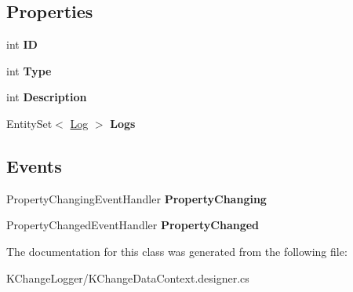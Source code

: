 \subsection*{Properties}
\begin{DoxyCompactItemize}
\item 
\hypertarget{class_k_change_logger_1_1_log___type_a3e5c1acf1eb6dbd8eb2b9b58bddafde5}{int {\bfseries I\-D}}\label{class_k_change_logger_1_1_log___type_a3e5c1acf1eb6dbd8eb2b9b58bddafde5}

\item 
\hypertarget{class_k_change_logger_1_1_log___type_ac250e1c00b8919515d4b7c14ac132bc3}{int {\bfseries Type}}\label{class_k_change_logger_1_1_log___type_ac250e1c00b8919515d4b7c14ac132bc3}

\item 
\hypertarget{class_k_change_logger_1_1_log___type_a746d939757ab897dc139994c8ef448c8}{int {\bfseries Description}}\label{class_k_change_logger_1_1_log___type_a746d939757ab897dc139994c8ef448c8}

\item 
\hypertarget{class_k_change_logger_1_1_log___type_a70b3fe63874918973bb1b28eb3aaeafd}{Entity\-Set$<$ \hyperlink{class_k_change_logger_1_1_log}{Log} $>$ {\bfseries Logs}}\label{class_k_change_logger_1_1_log___type_a70b3fe63874918973bb1b28eb3aaeafd}

\end{DoxyCompactItemize}
\subsection*{Events}
\begin{DoxyCompactItemize}
\item 
\hypertarget{class_k_change_logger_1_1_log___type_a3e406fb1cc77f029ca1842f63d5067bc}{Property\-Changing\-Event\-Handler {\bfseries Property\-Changing}}\label{class_k_change_logger_1_1_log___type_a3e406fb1cc77f029ca1842f63d5067bc}

\item 
\hypertarget{class_k_change_logger_1_1_log___type_af2867e46252e934c99a9f48801fd8368}{Property\-Changed\-Event\-Handler {\bfseries Property\-Changed}}\label{class_k_change_logger_1_1_log___type_af2867e46252e934c99a9f48801fd8368}

\end{DoxyCompactItemize}


The documentation for this class was generated from the following file\-:\begin{DoxyCompactItemize}
\item 
K\-Change\-Logger/K\-Change\-Data\-Context.\-designer.\-cs\end{DoxyCompactItemize}
